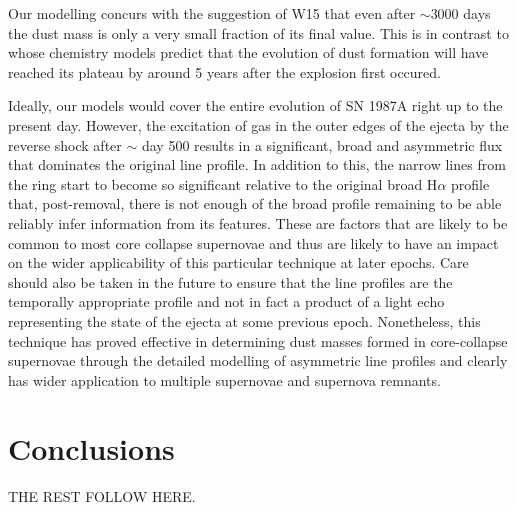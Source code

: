 Our modelling concurs with the suggestion of W15 that even after 
$\sim$3000 days the dust mass is only a very small fraction of its final 
value.  This is in contrast to \citet{Sarangi2015} whose chemistry models 
predict that the evolution of dust formation will have reached its plateau 
by around 5 years after the explosion first occured.

Ideally, our models would cover the entire evolution of SN 1987A right up 
to the present day.  However, the excitation of gas in the outer edges of 
the ejecta by the reverse shock after $\sim$ day 500 results in a 
significant, broad and asymmetric flux that dominates the original line 
profile.  In addition to this, the narrow lines from the ring start to 
become so significant relative to the original broad H$\alpha$ profile 
that, post-removal, there is not enough of the broad profile remaining to 
be able reliably infer information from its features.  These are factors 
that are likely to be common to most core collapse supernovae and thus are 
likely to have an impact on the wider applicability of this particular 
technique at later epochs.  Care should also be taken in the future to 
ensure that the line profiles are the temporally appropriate profile and 
not in fact a product of a light echo representing the state of the ejecta 
at some previous epoch.  Nonetheless, this technique has proved effective 
in determining dust masses formed in core-collapse supernovae through the 
detailed modelling of asymmetric line profiles and clearly has wider 
application to multiple supernovae and supernova remnants.

\section{Conclusions}


THE REST FOLLOW HERE. 


